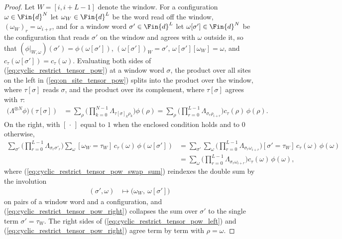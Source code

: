\begin{proof}
    \leanok
    Let $W=[i,i+L-1]$ denote the window. For a configuration $\omega\in\Fin{d}^{N}$
    let $\omega_W\in\Fin{d}^{L}$ be the word read off the window,
    $(\omega_W)_r=\omega_{i+r}$, and for a window word $\sigma'\in\Fin{d}^{L}$ let
    $\omega[\sigma']\in\Fin{d}^{N}$ be the configuration that reads $\sigma'$ on the
    window and agrees with $\omega$ outside it, so that
    $(\phi|_{W,\omega})(\sigma')=\phi(\omega[\sigma'])$,
    $(\omega[\sigma'])_W=\sigma'$, $\omega[\sigma'][\omega_W]=\omega$, and
    $c_\tau(\omega[\sigma'])=c_\tau(\omega)$. Evaluating both sides of
    (\ref{eq:cyclic_restrict_tensor_pow}) at a window word $\sigma$, the product
    over all sites on the left in (\ref{eq:on_site_tensor_pow}) splits into the
    product over the window, where $\tau[\sigma]$ reads $\sigma$, and the product
    over its complement, where $\tau[\sigma]$ agrees with $\tau$:
    \begin{align}
        \big(\Lambda^{\otimes N}\phi\big)(\tau[\sigma])
         & =\sum_{\rho}\Big(\prod_{k=0}^{N-1}\Lambda_{\tau[\sigma]_k\rho_k}\Big)\phi(\rho)
        =\sum_{\rho}\Big(\prod_{r=0}^{L-1}\Lambda_{\sigma_r\rho_{i+r}}\Big)
        c_\tau(\rho)\,\phi(\rho).
        \label{eq:cyclic_restrict_tensor_pow_left}
    \end{align}
    On the right, with $[\,\cdot\,]$ equal to $1$ when the enclosed condition holds
    and to $0$ otherwise,
    \begin{align}
        \sum_{\sigma'}\Big(\prod_{r=0}^{L-1}\Lambda_{\sigma_r\sigma'_r}\Big)
        \sum_{\omega}[\omega_W=\tau_W]\,c_\tau(\omega)\,\phi(\omega[\sigma'])
         & =\sum_{\sigma'}\sum_{\omega}
        \Big(\prod_{r=0}^{L-1}\Lambda_{\sigma_r\omega_{i+r}}\Big)
        [\sigma'=\tau_W]\,c_\tau(\omega)\,\phi(\omega)
        \label{eq:cyclic_restrict_tensor_pow_swap_sum}                             \\
         & =\sum_{\omega}\Big(\prod_{r=0}^{L-1}\Lambda_{\sigma_r\omega_{i+r}}\Big)
        c_\tau(\omega)\,\phi(\omega),
        \label{eq:cyclic_restrict_tensor_pow_right}
    \end{align}
    where (\ref{eq:cyclic_restrict_tensor_pow_swap_sum}) reindexes the double sum by the involution
    \begin{align}
        (\sigma',\omega) & \longmapsto\big(\omega_W,\ \omega[\sigma']\big)
        \label{eq:cyclic_restrict_tensor_pow_swap}
    \end{align}
    on pairs of a window word and a configuration, and (\ref{eq:cyclic_restrict_tensor_pow_right}) collapses the sum
    over $\sigma'$ to the single term $\sigma'=\tau_W$. The right sides of
    (\ref{eq:cyclic_restrict_tensor_pow_left}) and
    (\ref{eq:cyclic_restrict_tensor_pow_right}) agree term by term with
    $\rho=\omega$.
\end{proof}


